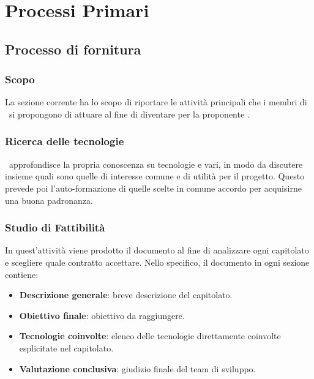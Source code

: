 \section{Processi Primari}\label{PP}

    \subsection{Processo di fornitura}\label{PP:Fornitura}	%

        \subsubsection{Scopo}\label{PP:Fornitura:Scopo}
		La sezione corrente ha lo scopo di riportare le  attività principali che i membri di \gruppo\ si propongono di attuare al fine di diventare  per la proponente \II.

		\subsubsection{Ricerca delle tecnologie}
		\gruppo\ approfondisce la propria conoscenza su tecnologie e  vari, in modo da discutere insieme quali sono
		quelle di interesse comune e di utilità per il progetto. Questo prevede poi l'auto-formazione di quelle scelte in comune accordo per acquisirne una buona padronanza.

        \subsubsection{Studio di Fattibilità}\label{PP:Fornitura:SdF}
        In quest'attività viene prodotto il documento \Doc{\SdFv} al fine di analizzare ogni capitolato e scegliere quale contratto accettare.
        Nello specifico, il documento in ogni sezione contiene:
        	\begin{itemize}
        		\item \textbf{Descrizione generale}: breve descrizione del capitolato.
        		\item \textbf{Obiettivo finale}: obiettivo da raggiungere.
        		\item \textbf{Tecnologie coinvolte}: elenco delle tecnologie direttamente coinvolte esplicitate nel capitolato.
        		\item \textbf{Valutazione conclusiva}: giudizio finale del team di sviluppo.
        	\end{itemize}


